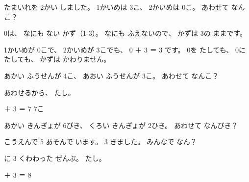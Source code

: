 \label{bk:1-4:zero}たまいれを 2かい しました。 1かいめは 3こ、 2かいめは 0こ。 あわせて なんこ？

\noindent\begin{minipage}[c]{0.5\linewidth}\centering
{}
\end{minipage}\hfill
\begin{minipage}[c]{0.47\linewidth}
0は、 なにも ない かず（1-3）。 なにも ふえないので、 かずは 3の ままです。
\end{minipage}
1かいめが 0こで、 2かいめが 3こでも、 0 ＋ 3 ＝ 3 です。 0を たしても、 0に たしても、 かずは かわりません。




\begin{reidai}[あわせる]
あかい ふうせんが 4こ、 あおい ふうせんが 3こ。 あわせて なんこ？

\noindent\begin{minipage}[c]{0.66\linewidth}
\kangaekata あわせるから、 たし。

 ＋ 3 ＝ 7 \kotaenext 7こ
\end{minipage}\hfill
\begin{minipage}[c]{0.32\linewidth}\centering
{}
\end{minipage}
\end{reidai}

\begin{jibun}
あかい きんぎょが 6ぴき、 くろい きんぎょが 2ひき。 あわせて なんびき？
\bkshikiran
{}
\end{jibun}

\begin{reidai}[ふえる]
こうえんで 5 あそんで います。 3 きました。 みんなで なん？

に 3 くわわった ぜんぶ。 たし。

 ＋ 3 ＝ 8 
\end{reidai}

